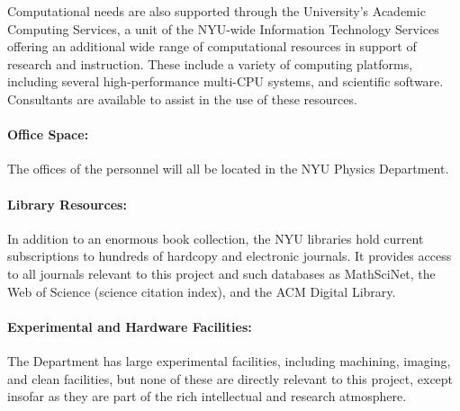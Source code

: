 \documentclass[letterpaper,12pt]{article}
\begin{document}
Computational needs are also supported through the University's
Academic Computing Services, a unit of the NYU-wide Information
Technology Services offering an additional wide range of computational
resources in support of research and instruction.  These include a
variety of computing platforms, including several high-performance
multi-CPU systems, and scientific software.  Consultants are available
to assist in the use of these resources.

\paragraph{Office Space:}

The offices of the personnel will all be located in the NYU Physics
Department.

\paragraph{Library Resources:}

In addition to an enormous book collection, the NYU libraries hold
current subscriptions to hundreds of hardcopy and electronic journals.
It provides access to all journals relevant to this project and such
databases as MathSciNet, the Web of Science (science citation index),
and the ACM Digital Library.

\paragraph{Experimental and Hardware Facilities:}

The Department has large experimental facilities, including machining,
imaging, and clean facilities, but none of these are directly relevant
to this project, except insofar as they are part of the rich
intellectual and research atmosphere.
\end{document}
